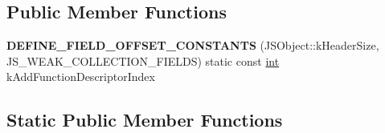 \subsection*{Public Member Functions}
\begin{DoxyCompactItemize}
\item 
\mbox{\label{classv8_1_1internal_1_1JSWeakCollection_a09a0c44f78b5e4ab0ff8bf99f6a0781c}} 
{\bfseries D\+E\+F\+I\+N\+E\+\_\+\+F\+I\+E\+L\+D\+\_\+\+O\+F\+F\+S\+E\+T\+\_\+\+C\+O\+N\+S\+T\+A\+N\+TS} (J\+S\+Object\+::k\+Header\+Size, J\+S\+\_\+\+W\+E\+A\+K\+\_\+\+C\+O\+L\+L\+E\+C\+T\+I\+O\+N\+\_\+\+F\+I\+E\+L\+DS) static const \mbox{\hyperlink{classint}{int}} k\+Add\+Function\+Descriptor\+Index
\end{DoxyCompactItemize}
\subsection*{Static Public Member Functions}
